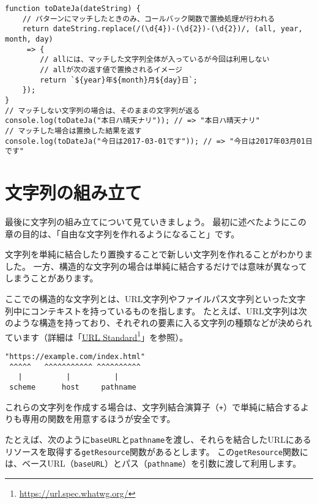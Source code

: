 \begin{lstlisting}
function toDateJa(dateString) {
    // パターンにマッチしたときのみ、コールバック関数で置換処理が行われる
    return dateString.replace(/(\d{4})-(\d{2})-(\d{2})/, (all, year, month, day)
     => {
        // allには、マッチした文字列全体が入っているが今回は利用しない
        // allが次の返す値で置換されるイメージ
        return `${year}年${month}月${day}日`;
    });
}
// マッチしない文字列の場合は、そのままの文字列が返る
console.log(toDateJa("本日ハ晴天ナリ")); // => "本日ハ晴天ナリ"
// マッチした場合は置換した結果を返す
console.log(toDateJa("今日は2017-03-01です")); // => "今日は2017年03月01日です"
\end{lstlisting}

\hypertarget{built}{%
\section{文字列の組み立て}\label{built}}

最後に文字列の組み立てについて見ていきましょう。
最初に述べたようにこの章の目的は、「自由な文字列を作れるようになること」です。

文字列を単純に結合したり置換することで新しい文字列を作れることがわかりました。
一方、構造的な文字列の場合は単純に結合するだけでは意味が異なってしまうことがあります。

ここでの構造的な文字列とは、URL文字列やファイルパス文字列といった文字列中にコンテキストを持っているものを指します。
たとえば、URL文字列は次のような構造を持っており、それぞれの要素に入る文字列の種類などが決められています（詳細は「\href{https://url.spec.whatwg.org/}{URL
Standard}\footnote{\url{https://url.spec.whatwg.org/}}」を参照）。

\begin{lstlisting}
"https://example.com/index.html"
 ^^^^^   ^^^^^^^^^^^ ^^^^^^^^^^   
   |          |     　　　|
 scheme      host     pathname
\end{lstlisting}

これらの文字列を作成する場合は、文字列結合演算子（\texttt{+}）で単純に結合するよりも専用の関数を用意するほうが安全です。

たとえば、次のように\texttt{baseURL}と\texttt{pathname}を渡し、それらを結合したURLにあるリソースを取得する\texttt{getResource}関数があるとします。
この\texttt{getResource}関数には、ベースURL（\texttt{baseURL}）とパス（\texttt{pathname}）を引数に渡して利用します。

